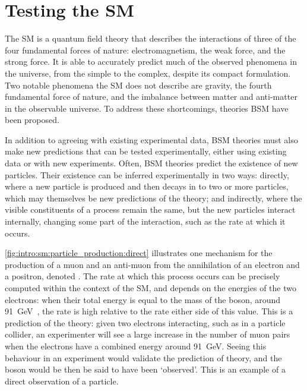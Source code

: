 \chapter{Testing the \acl{SM}}
\label{chap:intro:sm}

The \acl{SM} is a quantum field theory that describes the interactions of three 
of the four fundamental forces of nature: electromagnetism, the weak force, and 
the strong force.
It is able to accurately predict much of the observed phenomena in the 
universe, from the simple to the complex, despite its compact formulation.
Two notable phenomena the \ac{SM} does not describe are gravity, the fourth 
fundamental force of nature, and the imbalance between matter and anti-matter 
in the observable universe.
To address these shortcomings, theories \acl{BSM} have been proposed.

In addition to agreeing with existing experimental data, \ac{BSM} theories must 
also make new predictions that can be tested experimentally, either using 
existing data or with new experiments.
Often, \ac{BSM} theories predict the existence of new particles.
Their existence can be inferred experimentally in two ways: directly, where a 
new particle is produced and then decays in to two or more particles, which may 
themselves be new predictions of the theory; and indirectly, where the visible 
constituents of a process remain the same, but the new particles interact 
internally, changing some part of the interaction, such as the rate at which it 
occurs.

\cref{fig:intro:sm:particle_production:direct} illustrates one mechanism for 
the production of a muon and an anti-muon from the annihilation of an electron 
and a positron, denoted \decay{\Pelectron\APelectron}{\Pmuon\APmuon}.
The rate at which this process occurs can be precisely computed within the 
context of the \ac{SM}, and depends on the energies of the two electrons: when 
their total energy is equal to the mass of the \PZ boson, around 
\SI{91}{\GeV}~\cite{PDG2014}, the rate is high relative to the rate either side 
of this value.
This is a prediction of the theory: given two electrons interacting, such as in 
a particle collider, an experimenter will see a large increase in the number of 
muon pairs when the electrons have a combined energy around \SI{91}{\GeV}.
Seeing this behaviour in an experiment would validate the prediction of theory, 
and the \PZ boson would be then be said to have been `observed'.
This is an example of a direct observation of a particle.

